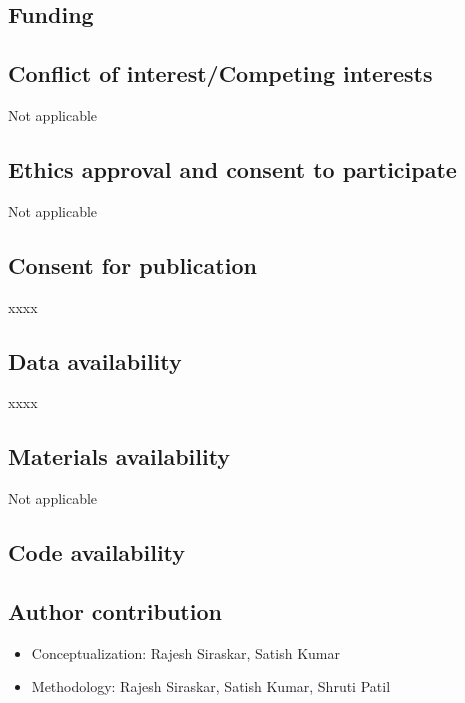 \documentclass[refree,sn-basic]{sn-jnl} %
\begin{document}
\subsection*{Funding}

\subsection*{Conflict of interest/Competing interests}
Not applicable

\subsection*{Ethics approval and consent to participate}
Not applicable

\subsection*{Consent for publication}
xxxx

\subsection*{Data availability}
xxxx

\subsection*{Materials availability}
Not applicable

\subsection*{Code availability}

\subsection*{Author contribution}
\begin{itemize}
        \item Conceptualization: Rajesh Siraskar, Satish Kumar
        \item Methodology: Rajesh Siraskar, Satish Kumar, Shruti Patil
\end{itemize}
\end{document}
